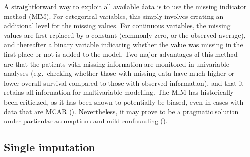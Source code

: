 \documentclass[
  letterpaper,
  paper=240mm:170mm,
  twoside=true,
  open=right,
  fontsize=10pt,
  pagesize=false,
  BCOR=15mm,
  DIV=14,
  headinclude=true,
  footinclude=false,
  headsepline=on]{scrbook}
\begin{document}
A straightforward way to exploit all available data is to use the
missing indicator method (MIM). For categorical variables, this simply
involves creating an additional level for the missing values. For
continuous variables, the missing values are first replaced by a
constant (commonly zero, or the observed average), and thereafter a
binary variable indicating whether the value was missing in the first
place or not is added to the model. Two major advantages of this method
are that the patients with missing information are monitored in
univariable analyses (e.g.~checking whether those with missing data have
much higher or lower overall survival compared to those with observed
information), and that it retains all information for multivariable
modelling. The MIM has historically been criticized, as it has been
shown to potentially be biased, even in cases with data that are MCAR
(). Nevertheless, it may prove to be a pragmatic solution
under particular assumptions and mild confounding
().

\subsection{Single imputation}\label{single-imputation}
\end{document}
